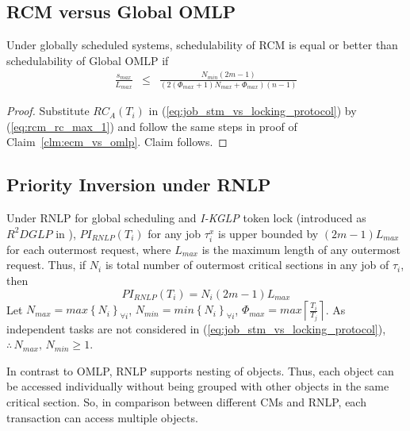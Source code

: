 \subsection{RCM versus Global OMLP}\label{subsec:rcm_vs_omlp}
%
\begin{clm}\label{clm:rcm_vs_omlp}
%
Under globally scheduled systems, schedulability of RCM is equal or
better than schedulability of Global OMLP if 
\begin{eqnarray}
\frac{s_{max}}{L_{max}} & \le & \frac{N_{min}\left(2m-1\right)}{\left(2\left(\Phi_{max}+1\right)N_{max}+\Phi_{max}\right)(n-1)}\label{eq:rcm_omlp_cmp_final}
\end{eqnarray}
%
\end{clm}
%
\begin{proof}
%
Substitute $RC_{A}(T_{i})$ in (\ref{eq:job_stm_vs_locking_protocol})
by (\ref{eq:rcm_rc_max_1}) and follow the same steps in proof of Claim~\ref{clm:ecm_vs_omlp}. Claim follows.
%
\end{proof}
%
\subsection{Priority Inversion under RNLP}\label{subsec:pi_rnlp}
%
Under RNLP\cite{6257574} for global scheduling and \textit{I-KGLP} token lock (introduced as $R^2DGLP$ in \cite{6300160}), $PI_{RNLP}(T_{i})$ for any job $\tau_{i}^{x}$ is upper bounded by $\left(2m-1\right)L_{max}$ for each outermost request, where $L_{max}$ is the maximum length
of any outermost request. Thus, if $N_{i}$ is total number of outermost critical sections in any job of $\tau_{i}$, then 
%
\begin{equation}
PI_{RNLP}(T_{i})=N_{i}(2m-1)L_{max}
\label{eq:rnlp_pi}
\end{equation}
%
Let $N_{max}=max\left\{ N_{i}\right\}_{\forall i} $, $N_{min}=min\left\{ N_{i}\right\}_{\forall i} $,
$\Phi_{max}=max\left\lceil\frac{T_i}{T_j}\right\rceil$. As independent tasks are not considered in (\ref{eq:job_stm_vs_locking_protocol}),
$\therefore\, N_{max},\, N_{min}\ge1$.

In contrast to OMLP, RNLP supports nesting of objects. Thus, each object can be accessed individually without being grouped with other objects in the same critical section. So, in comparison between different CMs and RNLP, each transaction can access multiple objects.
%
